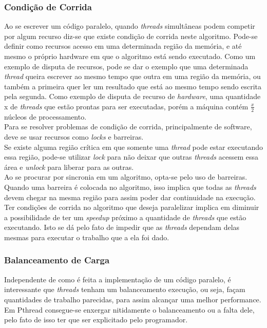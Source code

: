 \documentclass[12pt]{article}
\newcommand\tab[1][1cm]{\hspace*{#1}}
\begin{document}
\subsubsection{Condição de Corrida}\label{subsubsec:racecond}
\tab Ao se escrever um código paralelo, quando \textit{threads} simultâneas podem competir por algum recurso diz-se que existe condição de corrida neste algoritmo. Pode-se definir como recursos acesso em uma determinada região da memória, e até mesmo o próprio hardware em que o algoritmo está sendo executado. Como um exemplo de disputa de recursos, pode se dar o exemplo que uma determinada \textit{thread} queira escrever ao mesmo tempo que outra em uma região da memória, ou também a primeira quer ler um resultado que está ao mesmo tempo sendo escrita pela segunda. Como exemplo de disputa de recurso de \textit{hardware}, uma quantidade x de \textit{threads} que estão prontas para ser executadas, porém a máquina contém $\frac{x}{2}$ núcleos de processamento.
\\
\tab Para se resolver problemas de condição de corrida, principalmente de software, deve se usar recursos como \textit{locks} e barreiras. 
\\
\tab Se existe alguma região crítica em que somente uma \textit{thread} pode estar executando essa região, pode-se utilizar \textit{lock} para não deixar que outras \textit{threads} acessem essa área e \textit{unlock} para liberar para as outras.
\\
\tab Ao se procurar por sincronia em um algoritmo, opta-se pelo uso de barreiras. Quando uma barreira é colocada no algoritmo, isso implica que todas as \textit{threads} devem chegar na mesma região para assim poder dar continuidade na execução.
\\
\tab Ter condições de corrida no algoritmo que deseja paralelizar implica em diminuir a possibilidade de ter um \textit{speedup} próximo a quantidade de \textit{threads} que estão executando. Isto se dá pelo fato de impedir que as \textit{threads} dependam delas mesmas para executar o trabalho que a ela foi dado.

\subsubsection{Balanceamento de Carga}\label{subsubsec:cargabalanc}
\tab Independente de como é feita a implementação de um código paralelo, é interessante que \textit{threads} tenham um balanceamento execução, ou seja, façam quantidades de trabalho parecidas, para assim alcançar uma melhor performance. 
\\
\tab Em Pthread consegue-se enxergar nitidamente o balanceamento ou a falta dele, pelo fato de isso ter que ser explicitado pelo programador. 
\end{document}

